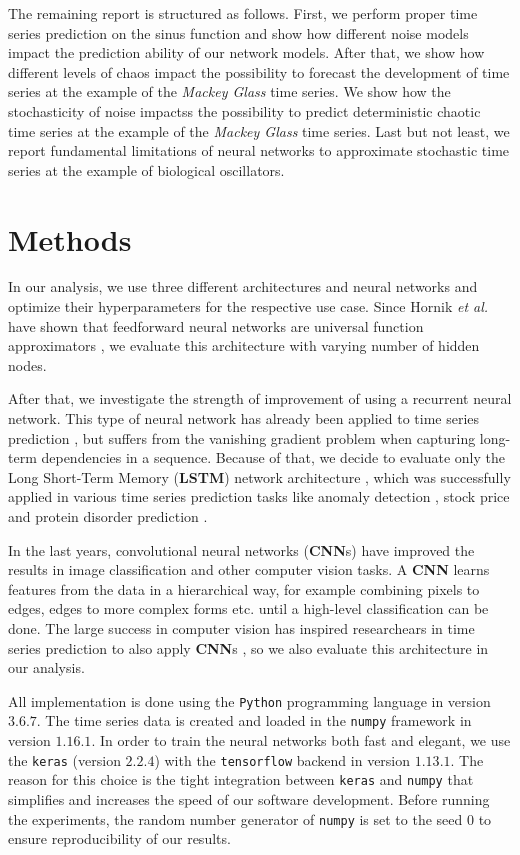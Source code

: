 \documentclass{article}
\begin{document}
The remaining report is structured as follows. First, we perform proper time
series prediction on the sinus function and show how different noise models
impact the prediction ability of our network models. After that, we show how 
different levels of chaos impact the possibility to forecast the development 
of time series at the example of the \emph{Mackey Glass} time series. We show
how the stochasticity of noise impactss the possibility to predict deterministic
chaotic time series at the example of the \emph{Mackey Glass} time series. Last
but not least, we report fundamental limitations of neural networks to
approximate stochastic time series at the example of biological oscillators.

\section{Methods}

In our analysis, we use three different architectures and neural networks and
optimize their hyperparameters for the respective use case. Since Hornik
\textit{et al.} have shown that feedforward neural networks are universal
function approximators \cite{hornik1989}, we evaluate this architecture with
varying number of hidden nodes.

After that, we investigate the strength of
improvement of using a recurrent neural network. This type of neural network has
already been applied to time series prediction \cite{connor1994}, but suffers
from the vanishing gradient problem when capturing long-term dependencies in a
sequence. Because of that, we decide to evaluate only the Long Short-Term Memory
(\textbf{LSTM})
network architecture \cite{hochreiter1997}, which was successfully applied in
various time series prediction tasks like anomaly detection \cite{malhotra2015},
stock price \cite{fischer2018} and protein disorder prediction
\cite{hanson2016}.

In the last years, convolutional neural networks (\textbf{CNN}s) have improved
the results in image classification \cite{krizhevsky2012} and other computer
vision tasks. A \textbf{CNN} learns features from the data in a hierarchical
way, for example combining pixels to edges, edges to more complex forms etc.
until a high-level classification can be done. The large success in computer
vision has inspired researchears in time series prediction to also apply
\textbf{CNN}s \cite{cui2016, borovykh2017}, so we also evaluate this
architecture in our analysis.

All implementation is done using the \texttt{Python} programming language in
version $3.6.7$. The time series data is created and loaded in the
\texttt{numpy} framework in version $1.16.1$. In order to train the neural
networks both fast and elegant, we use the \texttt{keras} (version $2.2.4$)
with the
\texttt{tensorflow} backend in version $1.13.1$.
The reason for this choice is the tight
integration between \texttt{keras} and \texttt{numpy} that simplifies and
increases the speed of our software development. Before running the experiments,
the random number generator of \texttt{numpy} is set to the seed $0$ to ensure
reproducibility of our results.
\end{document}

